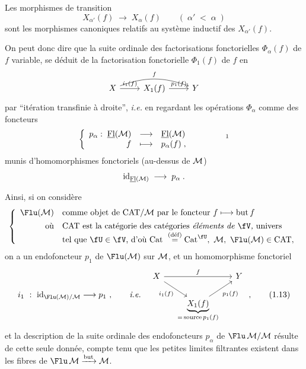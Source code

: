 Les morphismes de transition
\[
X_{\alpha'}(f) \;\longrightarrow\; X_\alpha(f) \qquad (\; \alpha' \;<\; \alpha \;)
\]
sont les morphismes canoniques relatifs au système inductif des $X_{\alpha'}(f)$.


On peut donc dire que la suite ordinale des factorisations fonctorielles $\Phi_\alpha(f)$ de $f$ variable, se déduit de la factorisation fonctorielle $\Phi_1(f)$ de $f$ en
\[
\begin{tikzcd}
X \arrow[r, "i_1(f)"] \arrow[rr, bend left=20, "f"] & X_1(f) \arrow[r, "p_1(f)"] & Y
\end{tikzcd}
\]
par “itération transfinie à droite”, \textit{i.e.} en regardant les opérations $\Phi_\alpha$ comme des foncteurs
\[
\left\{
\begin{array}{rcl}
p_\alpha :\; \uFl(\M) & \longrightarrow & \uFl(\M) \\
f & \longmapsto & p_\alpha(f) \;,
\end{array}
\right.
\qquad\qquad \text{\footnotemark}
\]
munis d'homomorphismes fonctoriels (au-dessus de $\mathcal{M}$)
\[
\mathrm{id}_{\underline{\mathrm{Fl}}(\mathcal{M})} \;\longrightarrow\; p_\alpha \;.
\]


Ainsi, si on considère
\[
\left\{
\begin{array}{rl}
\Flu(\cM) & \text{comme objet de CAT}/\cM \text{ par le foncteur } f \longmapsto \text{but}\, f\\[1ex]
\text{où} & \text{CAT est la catégorie des catégories \textit{éléments de} } \fV\text{\textit{,} univers}\\
 & \text{tel que } \fU \in \fV\text{, d'où Cat } \overset{\text{(déf)}}{=} \mathrm{Cat}^{\fU},\ \cM,\ \Flu(\cM) \in \text{CAT} ,
\end{array}
\right.
\]
on a un endofoncteur $p_1$ de $\Flu(\cM)$ sur $\mathcal{M}$, et un homomorphisme fonctoriel
\[
i_1 \ : \ \mathrm{id}_{\Flu(\cM)/\cM} \longrightarrow p_1 \ , \qquad \textit{i.e.} \quad
\begin{tikzcd}[column sep=small]
X \arrow[rr, "f"] \arrow[dr, "i_1(f)"'] & & Y \\
 & \underbrace{X_1(f)}_{=\,\text{source}\, p_1(f)} \arrow[ur, "p_1(f)"'] &
\end{tikzcd} \ ,
\tag*{(1.13)}
\]
et la description de la suite ordinale des endofoncteurs $p_\alpha$ de $\Flu\,\cM/\cM$ résulte de cette seule donnée, compte tenu que les petites limites filtrantes existent dans les fibres de $\Flu\,\cM \xrightarrow{\text{but}} \cM$.

